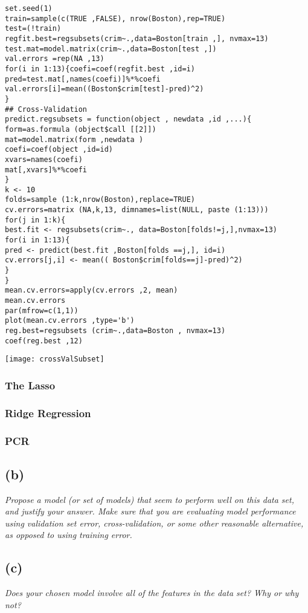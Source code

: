 \documentclass[a4paper,man,natbib]{apa6}
\begin{document}
\begin{verbatim}
set.seed(1)
train=sample(c(TRUE ,FALSE), nrow(Boston),rep=TRUE)
test=(!train)
regfit.best=regsubsets(crim~.,data=Boston[train ,], nvmax=13)
test.mat=model.matrix(crim~.,data=Boston[test ,])
val.errors =rep(NA ,13)
for(i in 1:13){coefi=coef(regfit.best ,id=i)
pred=test.mat[,names(coefi)]%*%coefi
val.errors[i]=mean((Boston$crim[test]-pred)^2)
}
## Cross-Validation
predict.regsubsets = function(object , newdata ,id ,...){
form=as.formula (object$call [[2]])
mat=model.matrix(form ,newdata )
coefi=coef(object ,id=id)
xvars=names(coefi)
mat[,xvars]%*%coefi
}
k <- 10
folds=sample (1:k,nrow(Boston),replace=TRUE)
cv.errors=matrix (NA,k,13, dimnames=list(NULL, paste (1:13)))
for(j in 1:k){
best.fit <- regsubsets(crim~., data=Boston[folds!=j,],nvmax=13)
for(i in 1:13){
pred <- predict(best.fit ,Boston[folds ==j,], id=i)
cv.errors[j,i] <- mean(( Boston$crim[folds==j]-pred)^2)
}
}
mean.cv.errors=apply(cv.errors ,2, mean)
mean.cv.errors
par(mfrow=c(1,1))
plot(mean.cv.errors ,type='b')
reg.best=regsubsets (crim~.,data=Boston , nvmax=13)
coef(reg.best ,12)
\end{verbatim}

\texttt{[image: crossValSubset]}

\subsubsection{The Lasso}

\subsubsection{Ridge Regression}

\subsubsection{PCR}

\subsection{(b)} 
\emph{Propose a model (or set of models) that seem to perform well on
	this data set, and justify your answer. Make sure that you are
	evaluating model performance using validation set error, cross-validation, or some other reasonable alternative, as opposed to
	using training error.}

\subsection{(c)} 
\emph{Does your chosen model involve all of the features in the data
	set? Why or why not?}
\end{document}
